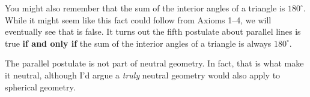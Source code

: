 \documentclass[noauthor,nooutcomes,12pt,hints,handout,newpage]{ximera}
\begin{document}
You might also remember that the sum of the interior angles of a
triangle is $180^\circ$. While it might seem like this fact could
follow from Axioms 1--4, we will eventually see that is false. It turns
out the fifth postulate about parallel lines is true {\bf if and only
  if} the sum of the interior angles of a triangle is always
$180^\circ$.%

\begin{remark}
  The parallel postulate is not part of neutral geometry. In fact,
  that is what make it neutral, although I'd argue a \emph{truly}
  neutral geometry would also apply to spherical geometry.
\end{remark}
\end{document}
